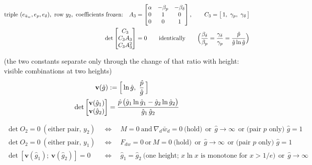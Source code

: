 \documentclass[11pt,a4paper,fontset=none]{ctexart}
\newcommand{\ba}{\bar{a}}
\newcommand{\bw}{\bar{w}}
\newcommand{\ph}{\hat{p}}
\newcommand{\dl}{\delta}
\newcommand{\gh}{\hat{g}}
\begin{document}
\begin{align*}
\text{triple } (e_{\ba_w}, e_p, e_{\dl}),\ \text{row } y_2,\ \text{coefficients frozen:}\quad
A_3 &= \begin{bmatrix} \alpha & -\beta_p & -\beta_{\dl} \\ 0 & 1 & 0 \\ 0 & 0 & 1 \end{bmatrix}, \qquad
C_3 = \bigl[\,1,\ \gamma_p,\ \gamma_{\dl}\,\bigr] \\
\det\begin{bmatrix} C_3 \\ C_3A_3 \\ C_3A_3^{2} \end{bmatrix} &= 0 \qquad \text{identically}
\qquad\Bigl(\frac{\beta_{\dl}}{\beta_p} = \frac{\gamma_{\dl}}{\gamma_p} = \frac{\ph}{\gh\ln\gh}\Bigr)
\end{align*}

(the two constants separate only through the change of that ratio with height: visible combinations at two heights)
\begin{align*}
\mathbf{v}(\gh) &:= \Bigl[\,\ln\gh,\ \frac{\ph}{\gh}\,\Bigr] \\
\det\begin{bmatrix} \mathbf{v}(\gh_1) \\ \mathbf{v}(\gh_2) \end{bmatrix}
                &= \frac{\ph\,\bigl(\gh_1\ln\gh_1 - \gh_2\ln\gh_2\bigr)}{\gh_1\,\gh_2}
\end{align*}

\begin{align*}
\det O_2 = 0 \ (\text{either pair, } y_2) \quad&\Longleftrightarrow\quad M = 0 \ \text{and}\ \nabla_d\bw_d = 0 \ \text{(hold)} \ \ \text{or}\ \ \gh \to \infty
\ \ \text{or (pair } p\text{ only) } \gh = 1 \\
\det O_2 = 0 \ (\text{either pair, } y_1) \quad&\Longleftrightarrow\quad F_{dw} = 0 \ \text{or}\ M = 0 \ \text{(hold)} \ \ \text{or}\ \ \gh \to \infty
\ \ \text{or (pair } p\text{ only) } \gh = 1 \\
\det[\mathbf{v}(\gh_1);\ \mathbf{v}(\gh_2)] = 0 \quad&\Longleftrightarrow\quad \gh_1 = \gh_2 \ \text{(one height; } x\ln x \text{ is monotone for } x > 1/e) \ \ \text{or}\ \ \gh \to \infty
\end{align*}
\end{document}
